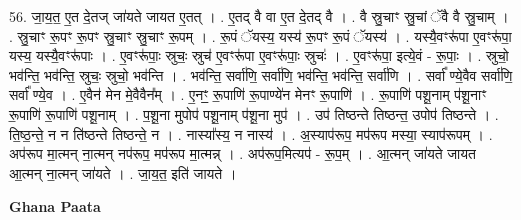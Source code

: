 \documentclass[17pt]{extarticle}
\begin{document}
56. जा॒य॒त॒ ए॒त दे॒तज् जा॑यते जायत ए॒तत् । . ए॒तद् वै वा ए॒त दे॒तद् वै । . वै स्रु॒चाꣳ स्रु॒चां ॅवै वै स्रु॒चाम् । . स्रु॒चाꣳ रू॒पꣳ रू॒पꣳ स्रु॒चाꣳ स्रु॒चाꣳ रू॒पम् । . रू॒पं ॅयस्य॒ यस्य॑ रू॒पꣳ रू॒पं ॅयस्य॑ । . यस्यै॒वꣳरू॑पा ए॒वꣳरू॑पा॒ यस्य॒ यस्यै॒वꣳरू॑पाः । . ए॒वꣳरू॑पाः॒ स्रुचः॒ स्रुच॑ ए॒वꣳरू॑पा ए॒वꣳरू॑पाः॒ स्रुचः॑ । . ए॒वꣳरू॑पा॒ इत्ये॒वं - रू॒पाः॒ । . स्रुचो॒ भव॑न्ति॒ भव॑न्ति॒ स्रुचः॒ स्रुचो॒ भव॑न्ति । . भव॑न्ति॒ सर्वा॑णि॒ सर्वा॑णि॒ भव॑न्ति॒ भव॑न्ति॒ सर्वा॑णि । . सर्वा᳚ ण्ये॒वैव सर्वा॑णि॒ सर्वा᳚ ण्ये॒व । . ए॒वैन॑ मेन मे॒वैवैन᳚म् । . ए॒नꣳ॒॒ रू॒पाणि॑ रू॒पाण्ये॑न मेनꣳ रू॒पाणि॑ । . रू॒पाणि॑ पशू॒नाम् प॑शू॒नाꣳ रू॒पाणि॑ रू॒पाणि॑ पशू॒नाम् । . प॒शू॒ना मुपोप॑ पशू॒नाम् प॑शू॒ना मुप॑ । . उप॑ तिष्ठन्ते तिष्ठन्त॒ उपोप॑ तिष्ठन्ते । . ति॒ष्ठ॒न्ते॒ न न ति॑ष्ठन्ते तिष्ठन्ते॒ न । . नास्या᳚स्य॒ न नास्य॑ । . अ॒स्याप॑रूप॒ मप॑रूप मस्या॒ स्याप॑रूपम् । . अप॑रूप मा॒त्मन् ना॒त्मन् नप॑रूप॒ मप॑रूप मा॒त्मन्न् । . अप॑रूप॒मित्यप॑ - रू॒प॒म् । . आ॒त्मन् जा॑यते जायत आ॒त्मन् ना॒त्मन् जा॑यते । . जा॒य॒त॒ इति॑ जायते । \newline

\textbf{Ghana Paata } \newline
\end{document}
